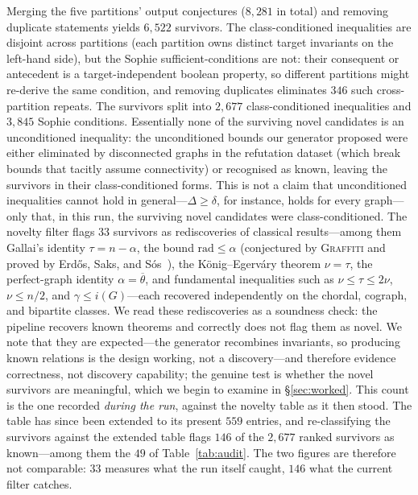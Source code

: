 \documentclass[]{ceurart}
\begin{document}
Merging the five partitions' output conjectures ($8{,}281$ in total) and removing duplicate
statements yields $6{,}522$ survivors. The class-conditioned inequalities
are disjoint across partitions (each partition owns distinct target invariants on the
left-hand side), but the Sophie sufficient-conditions are not: their
consequent or antecedent is a target-independent boolean property, so different partitions might
re-derive the same condition, and removing duplicates eliminates $346$ such cross-partition
repeats. The survivors split into $2{,}677$ class-conditioned inequalities and
$3{,}845$ Sophie conditions. Essentially none of the surviving novel candidates is an
unconditioned inequality: the unconditioned bounds our generator proposed were either eliminated
by disconnected graphs in the refutation dataset (which break bounds that tacitly assume connectivity) or
recognised as known, leaving the survivors in their class-conditioned forms. This is not a claim that
unconditioned inequalities cannot hold in general---$\Delta\ge\delta$, for instance, holds for every
graph---only that, in this run, the surviving novel candidates were class-conditioned. The novelty filter
flags $33$ survivors as rediscoveries of classical results---among them Gallai's identity $\tau = n - \alpha$, the bound $\mathrm{rad} \le \alpha$ (conjectured by \textsc{Graffiti} and proved by Erd\H{o}s, Saks, and S\'os~\cite{erdos1986induced}), the K\"onig--Egerv\'ary theorem $\nu = \tau$, the perfect-graph identity $\alpha = \overline{\theta}$, and fundamental inequalities such as $\nu \le \tau \le 2\nu$, $\nu \le n/2$, and $\gamma \le i(G)$---each recovered independently on the chordal, cograph, and bipartite classes. We read these rediscoveries as a soundness check: the pipeline recovers known theorems and correctly does not flag them as novel. We note that they are expected---the generator recombines invariants, so producing known relations is the design working, not a discovery---and therefore evidence correctness, not discovery capability; the genuine test is whether the novel survivors are meaningful, which we begin to examine in \S\ref{sec:worked}.
This count is the one recorded \emph{during the run}, against the novelty table as it
then stood. The table has since been extended to its present $559$ entries, and
re-classifying the survivors against the extended table flags $146$ of the $2{,}677$
ranked survivors as known---among them the $49$ of Table~\ref{tab:audit}. The two
figures are therefore not comparable: $33$ measures what the run itself caught, $146$
what the current filter catches. 
\end{document}
